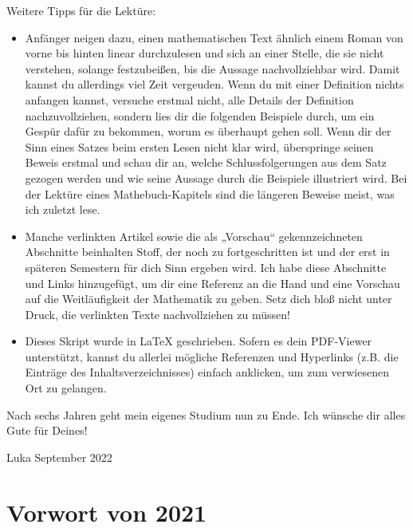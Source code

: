 Weitere Tipps für die Lektüre:
\begin{itemize}
    \item Anfänger neigen dazu, einen mathematischen Text ähnlich einem Roman von vorne bis hinten linear durchzulesen und sich an einer Stelle, die sie nicht verstehen, solange festzubeißen, bis die Aussage nachvollziehbar wird. Damit kannst du allerdings viel Zeit vergeuden. Wenn du mit einer Definition nichts anfangen kannst, versuche erstmal nicht, alle Details der Definition nachzuvollziehen, sondern lies dir die folgenden Beispiele durch, um ein Gespür dafür zu bekommen, worum es überhaupt gehen soll. Wenn dir der Sinn eines Satzes beim ersten Lesen nicht klar wird, überspringe seinen Beweis erstmal und schau dir an, welche Schlussfolgerungen aus dem Satz gezogen werden und wie seine Aussage durch die Beispiele illustriert wird. Bei der Lektüre eines Mathebuch-Kapitels sind die längeren Beweise meist, was ich zuletzt lese.
    \item Manche verlinkten Artikel sowie die als „Vorschau“ gekennzeichneten Abschnitte beinhalten Stoff, der noch zu fortgeschritten ist und der erst in späteren Semestern für dich Sinn ergeben wird. Ich habe diese Abschnitte und Links hinzugefügt, um dir eine Referenz an die Hand und eine Vorschau auf die Weitläufigkeit der Mathematik zu geben. Setz dich bloß nicht unter Druck, die verlinkten Texte nachvollziehen zu müssen!
    \item Dieses Skript wurde in {\LaTeX} geschrieben. Sofern es dein PDF-Viewer unterstützt, kannst du allerlei mögliche Referenzen und Hyperlinks (z.B. die Einträge des Inhaltsverzeichnisses) einfach anklicken, um zum verwiesenen Ort zu gelangen.
\end{itemize}
Nach sechs Jahren geht mein eigenes Studium nun zu Ende. Ich wünsche dir alles Gute für Deines!

\quad

Luka \hfill September 2022





\clearpage
\section*{Vorwort von 2021}

